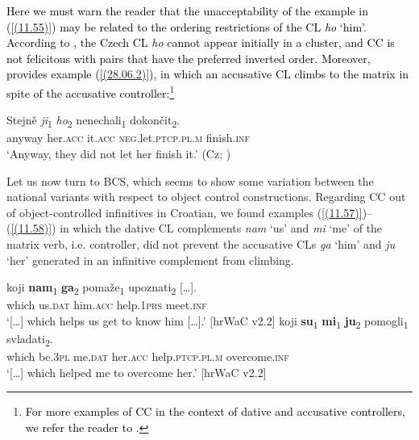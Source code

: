 \noindent \textcolor{black}{Here we must warn the reader that the unacceptability of the example in (\ref{(11.55)}) may be related to the ordering restrictions of the CL \textit{ho} ‘him'. According to \citet[153f]{Lenertova04}, the Czech CL \textit{ho} cannot appear initially in a cluster, and CC is not felicitous with pairs that have the preferred inverted order. Moreover, \citet[154]{Lenertova04} provides example (\ref{(28.06.2)}), in which an accusative CL climbs to the matrix in spite of the accusative controller:}\footnote{\textcolor{black}{For more examples of CC in the context of dative and accusative controllers, we refer the reader to \citet[162]{Lenertova04}.} }

\begin{exe}\ex\label{(28.06.2)}
\gll Stejně \textit{ji}\textsubscript{1} \textit{ho}\textsubscript{2} nenechali\textsubscript{1} dokončit\textsubscript{2}. \\
anyway her.\textsc{acc} it.\textsc{acc} \textsc{neg}.let.\textsc{ptcp.pl.m} finish.\textsc{inf} \\
\glt ‘Anyway, they did not let her finish it.’
\hfill (Cz; \citealt[153f]{Lenertova04}) %
\end{exe}


\noindent Let us now turn to BCS, which seems to show some variation between the national variants with respect to object control constructions. Regarding CC out of object-controlled infinitives in Croatian, we found examples (\ref{(11.57)})--(\ref{(11.58)}) in which the dative CL complements \textit{nam} ‘us’ and \textit{mi} ‘me’ of the matrix verb, i.e. controller, did not prevent the accusative CLs \textit{ga} ‘him’ and \textit{ju} ‘her’ generated in an infinitive complement from climbing. 

\begin{exe}\ex\label{(11.57)}
\gll [\dots] koji \textbf{nam}\textsubscript{1} \textbf{ga}\textsubscript{2} pomaže\textsubscript{1} {upoznati\textsubscript{2} [\dots].} \\
{} which us.\textsc{dat} him.\textsc{acc} help.1\textsc{prs} meet.\textsc{inf} \\
\glt ‘[\dots] which helps us get to know him [\dots].’
\hfill [hrWaC v2.2]
\ex\label{(11.58)}
\gll [\dots] koji \textbf{su}\textsubscript{1} \textbf{mi}\textsubscript{1} \textbf{ju}\textsubscript{2} pomogli\textsubscript{1} svladati\textsubscript{2}. \\
{} which be.3\textsc{pl} me.\textsc{dat} her.\textsc{acc} help.\textsc{ptcp}.\textsc{pl}.\textsc{m} overcome.\textsc{inf} \\
\glt ‘[\dots] which helped me to overcome her.’
\hfill [hrWaC v2.2]
\end{exe}


